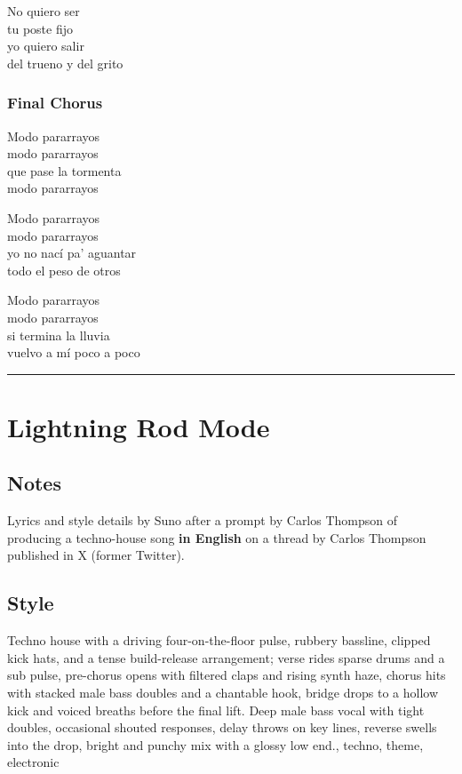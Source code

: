 No quiero ser\\
tu poste fijo\\
yo quiero salir\\
del trueno y del grito

\subsubsection{Final Chorus}\label{final-chorus}

Modo pararrayos\\
modo pararrayos\\
que pase la tormenta\\
modo pararrayos

Modo pararrayos\\
modo pararrayos\\
yo no nací pa' aguantar\\
todo el peso de otros

Modo pararrayos\\
modo pararrayos\\
si termina la lluvia\\
vuelvo a mí poco a poco

\begin{center}\rule{0.5\linewidth}{0.5pt}\end{center}

\section{Lightning Rod Mode}\label{lightning-rod-mode}

\subsection{Notes}\label{notes-7}

Lyrics and style details by Suno after a prompt by Carlos Thompson of
producing a techno-house song \textbf{in English} on a thread by Carlos
Thompson published in X (former Twitter).

\subsection{Style}\label{style-7}

Techno house with a driving four-on-the-floor pulse, rubbery bassline,
clipped kick hats, and a tense build-release arrangement; verse rides
sparse drums and a sub pulse, pre-chorus opens with filtered claps and
rising synth haze, chorus hits with stacked male bass doubles and a
chantable hook, bridge drops to a hollow kick and voiced breaths before
the final lift. Deep male bass vocal with tight doubles, occasional
shouted responses, delay throws on key lines, reverse swells into the
drop, bright and punchy mix with a glossy low end., techno, theme,
electronic

